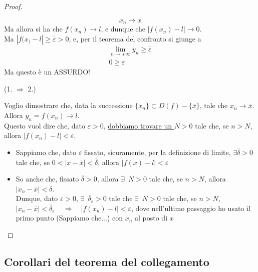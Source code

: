 \documentclass{article}
\theoremstyle{definition}
\begin{document}
\begin{proof}
\begin{itemize}
        \begin{equation}
            x_n \to x
        \end{equation}
        Ma allora si ha che $f(x_n) \to l$, e dunque che $|f(x_n)-l|\to 0$.
        \\
        Ma $|f(x_)-l| \geqslant \overline{\varepsilon}>0$, e, per il teorema del confronto si giunge a
        \begin{align}
            \lim_{n \to +\infty}y_n \geqslant \overline{\varepsilon} \\
            0 \geqslant \varepsilon
        \end{align}
        Ma questo è un ASSURDO!
    \end{itemize}
    \begin{center}
        (1. $\Longrightarrow$ 2.)
    \end{center}
    Voglio dimostrare che, data la successione $\{x_n\} \subset D(f)-\{\overline{x}\}$, tale che $x_n \to \overline{x}$.
    \\
    Allora $y_n=f(x_n) \to l$.
    \\
    Questo vuol dire che, dato $\varepsilon>0$, \underline{dobbiamo trovare un $N>0$} tale che, se $n>N$, allora $|f(x_n)-l|<\varepsilon$.
    \\
    \begin{itemize}
        \item Sappiamo che, dato $\varepsilon$ fissato, sicuramente, per la definizione di limite, $\exists \overline{\delta}>0$ tale che, se $0<|x-\overline{x}|<\overline{\delta}$, allora $|f(x)-l|<\varepsilon$
        \item So anche che, fissato $\overline{\delta}>0$, allora $\exists \,\,\, N>0$ tale che, se $n>N$, allora $|x_n-\overline{x}|<\delta$.
        \\
        Dunque, dato $\varepsilon > 0$, $\exists \,\,\, \overline{\delta}_\varepsilon > 0$ tale che $\exists \,\,\, N>0$ tale che, se $n>N$, $|x_n-\overline{x}| < \overline{\delta}_\varepsilon\,\,\,\,\,\,\, \Longrightarrow \,\,\,\,\,\, |f(x_n)-l|<\varepsilon$, dove nell'ultimo passaggio ho usato il primo punto (Sappiamo che...) con $x_n$ al posto di $x$
    \end{itemize}
\end{proof}

\subsection{Corollari del teorema del collegamento}
\end{document}
